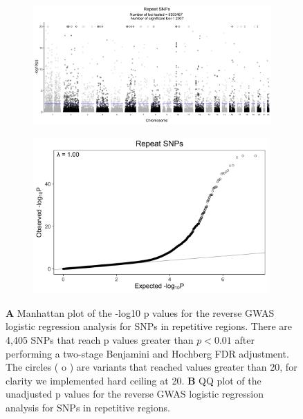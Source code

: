 \documentclass[9pt,lineno]{elife}
\begin{document}
\begin{figure} \centering
    \begin{subfigure}[b]{\linewidth}
        \includegraphics[width=\hsize]{./Figures/ManhattanPlot_Repeat_SNPs.jpg}
        \label{fig:a}
    \end{subfigure} %

    \begin{subfigure}[b]{\linewidth}
    	\center    
        \includegraphics[width=90mm]{./Figures/Repeat_SNPs_QQ.jpg}
        \label{fig:b}    
    \end{subfigure} 
    \caption{\textbf{A} Manhattan plot of the -log10 p values for the reverse GWAS logistic regression analysis for SNPs in repetitive regions. There are 4,405 SNPs that reach p values greater than $ p < 0.01$ after performing a two-stage Benjamini and Hochberg FDR adjustment.  The circles ( o ) are variants that reached values greater than 20, for clarity we implemented hard ceiling at 20. 
  \textbf{B} QQ plot of the unadjusted p values for the reverse GWAS logistic regression analysis for SNPs in repetitive regions.}
  \label{RS_Manhattan}
  \end{figure}
  
\end{document}
